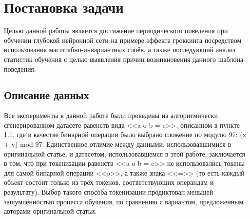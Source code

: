 \documentclass{article}
\begin{document}
\section{Постановка задачи}
Целью данной работы является достижение периодического поведения при обучении глубокой нейронной сети на примере эффекта гроккинга посредством использования масштабно-инвариантных слоёв, а также последующий анализ статистик обучения с целью выявления причин возникновения данного шаблона поведения.
\subsection{Описание данных}
Все эксперименты в данной работе были проведены на алгоритмически сгенерированном датасете равенств вида <<a o b = c>>, описанном в пункте 1.1, где в качестве бинарной операции было выбрано сложение по модулю 97: (x + y) mod 97. Единственное отличие между данными, использовавшимися в оригинальной статье, и датасетом, использовавшемся в этой работе, заключается в том, что при токенизации равенств <<a o b = c>> не использовались токены для самой бинарной операции <<o>>, а также знака <<=>> (то есть каждый объект состоит только из трёх токенов, соответствующих операндам и результату). Выбор такого способа токенизации продиктован меньшей зашумлённостью процесса обучения, по сравнению с вариантом, предложенным авторами оригинальной статьи.
\end{document}
